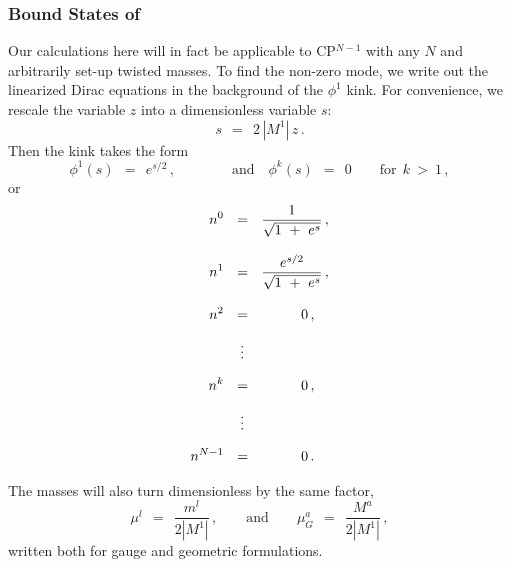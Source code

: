 \documentclass[epsfig,12pt]{article}
\def\beq{\begin{equation}}
\def\eeq{\end{equation}}
\def\beq{\begin{equation}}
\def\eeq{\end{equation}}
\begin{document}
\subsubsection[Bound States of $\psi^k$]
	{Bound States of }
\label{bound}


	Our calculations here will in fact be applicable to CP$^{N-1}$ with any $ N $ 
	and arbitrarily set-up twisted masses.
	To find the non-zero mode, we write out the linearized Dirac equations in the background
	of the $ \phi^1 $ kink.
	For convenience, we rescale the variable $ z $ into a dimensionless variable $ s $:
\beq
	s ~~=~~ 2\, |M^1|\, z\,.
\eeq
	Then the kink takes the form
\beq
	\phi^1(s) ~~=~~ e^{s/2}\,,\qquad\qquad\text{and}\quad \phi^k(s) ~~=~~ 0 \qquad \text{for}~~ k ~>~ 1\,,
\eeq
	or
\begin{align}
%
\notag
	n^0  & ~~=~~ \frac {             1              }
                           {    \sqrt{ 1 ~+~ e^s }      }\,, \\[3mm]
%
\notag
	n^1  & ~~=~~ \frac {          e^{s/2}           }
                           {    \sqrt{ 1 ~+~ e^s }      }\,, \\[3mm]
%
\notag
	n^2  & ~~=~~ \qquad~~\, 0\,,  \\[2mm]
%	 
 	     & ~~~\,\vdots          \\[2mm]
%
\notag
	n^k  & ~~=~~ \qquad~~\, 0\,,  \\[2mm]
%	 
\notag
 	     & ~~~\,\vdots          \\[2mm]
%
\notag
	n^{N-1} & ~~=~~ \qquad~~\, 0\,.                
\end{align}

	The masses will also turn dimensionless by the same factor,
\beq
	\mu^l  ~~=~~ \frac{ m^l }
                        {2 |M^1|}\,,
	 \qquad
	 \text{and}
	 \qquad
	 \mu_G^a ~~=~~ \frac{ M^a }
                           {2 |M^1|}\,,
\eeq
	written both for gauge and geometric formulations.
\end{document}
